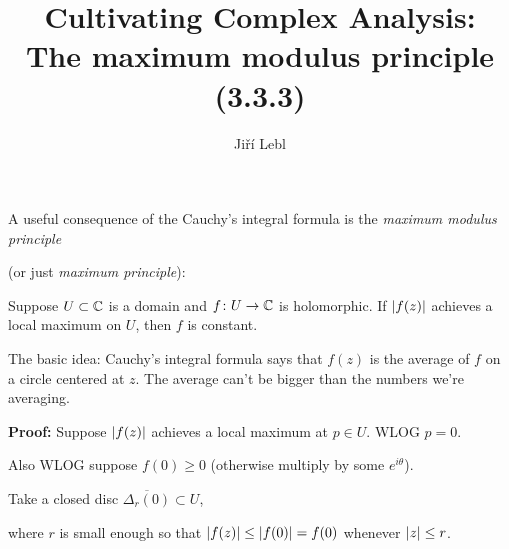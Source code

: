 \documentclass[10pt,aspectratio=169]{beamer}
\author{Ji\v{r}\'i Lebl}
\institute[OSU]{%
Departemento pri Matematiko de Oklahoma {\^S}tata Universitato}
\title{Cultivating Complex Analysis:\\%
The maximum modulus principle (3.3.3)}
\date{}
\begin{document}
\begin{frame}
\titlepage
\end{frame}

\begin{frame}
A useful consequence of the Cauchy's integral formula is the
\emph{maximum modulus principle}

(or just \emph{maximum principle}):

\pause

\begin{theorem}
Suppose $U \subset {\mathbb{C}}$ is a domain and
$f \colon U \to {\mathbb{C}}$ is holomorphic.
If $\lvert {f(z)} \rvert$ achieves a local maximum on $U$, then $f$ is constant.
\end{theorem}

\pause

The basic idea:
Cauchy's integral formula says that $f(z)$ is the average of $f$ on a
circle centered at $z$.
The average can't be bigger than the numbers we're averaging.

\pause
\medskip

\textbf{Proof:}
Suppose $\lvert {f(z)} \rvert$ achieves a local maximum at $p \in U$.  WLOG $p=0$.

\medskip
\pause

Also WLOG suppose $f(0) \geq 0$ (otherwise multiply by some $e^{i\theta}$).

\medskip
\pause

Take a closed disc $\overline{\Delta_r(0)} \subset U$,

where $r$ is small enough so that
$\lvert {f(z)} \rvert \leq \lvert {f(0)} \rvert = f(0)$ whenever $\lvert {z} \rvert \leq r$.

\end{frame}
\end{document}
